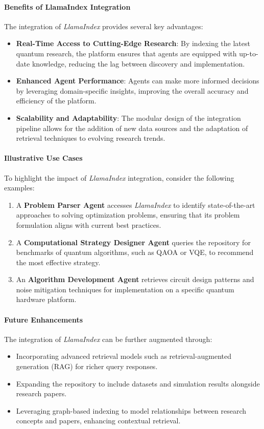 \documentclass[12pt]{article}
\begin{document}
\paragraph{Benefits of LlamaIndex Integration}
The integration of \textit{LlamaIndex} provides several key advantages:
\begin{itemize}
    \item \textbf{Real-Time Access to Cutting-Edge Research}: By indexing the latest quantum research, the platform ensures that agents are equipped with up-to-date knowledge, reducing the lag between discovery and implementation.
    \item \textbf{Enhanced Agent Performance}: Agents can make more informed decisions by leveraging domain-specific insights, improving the overall accuracy and efficiency of the platform.
    \item \textbf{Scalability and Adaptability}: The modular design of the integration pipeline allows for the addition of new data sources and the adaptation of retrieval techniques to evolving research trends.
\end{itemize}

\paragraph{Illustrative Use Cases}
To highlight the impact of \textit{LlamaIndex} integration, consider the following examples:
\begin{enumerate}
    \item A \textbf{Problem Parser Agent} accesses \textit{LlamaIndex} to identify state-of-the-art approaches to solving optimization problems, ensuring that its problem formulation aligns with current best practices.
    \item A \textbf{Computational Strategy Designer Agent} queries the repository for benchmarks of quantum algorithms, such as QAOA or VQE, to recommend the most effective strategy.
    \item An \textbf{Algorithm Development Agent} retrieves circuit design patterns and noise mitigation techniques for implementation on a specific quantum hardware platform.
\end{enumerate}

\paragraph{Future Enhancements}
The integration of \textit{LlamaIndex} can be further augmented through:
\begin{itemize}
    \item Incorporating advanced retrieval models such as retrieval-augmented generation (RAG) for richer query responses.
    \item Expanding the repository to include datasets and simulation results alongside research papers.
    \item Leveraging graph-based indexing to model relationships between research concepts and papers, enhancing contextual retrieval.
\end{itemize}
\end{document}
